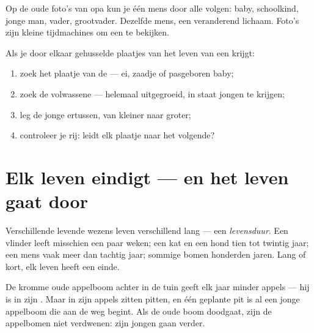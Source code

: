 \begin{example}[De fototest]\label{ex:g2:born-grow-die:photo}
Op de oude foto's van opa kun je één mens door alle  volgen:
baby, schoolkind, jonge man, vader, grootvader. Dezelfde mens, een
veranderend lichaam. Foto's zijn kleine tijdmachines om een
 te bekijken.
\end{example}

\begin{method}\label{met:g2:born-grow-die:order}
Als je door elkaar gehusselde plaatjes van het leven van een  krijgt:
\begin{enumerate}
  \item zoek het plaatje van de  --- ei, zaadje of pasgeboren baby;
  \item zoek de volwassene --- helemaal uitgegroeid, in staat jongen te krijgen;
  \item leg de jonge  ertussen, van kleiner naar groter;
  \item controleer je rij: leidt elk plaatje naar het volgende?
\end{enumerate}
\end{method}

\section{Elk leven eindigt --- en het leven gaat door}

\begin{proposition}[Levensduur]\label{prop:g2:born-grow-die:lifespan}
Verschillende levende wezens leven verschillend lang --- een
\emph{levensduur}. Een vlinder leeft misschien een
paar weken; een kat en een hond tien tot twintig jaar; een mens vaak
meer dan tachtig jaar; sommige bomen honderden jaren. Lang of kort, elk
leven heeft een einde.
\end{proposition}
\admitted

\begin{example}\label{ex:g2:born-grow-die:oldtree}
De kromme oude appelboom achter in de tuin geeft elk jaar minder
appels --- hij is in zijn . Maar in zijn appels zitten pitten,
en één geplante pit is al een jonge appelboom die aan de weg begint.
Als de oude boom doodgaat, zijn de appelbomen niet verdwenen: zijn
jongen gaan verder.
\end{example}


